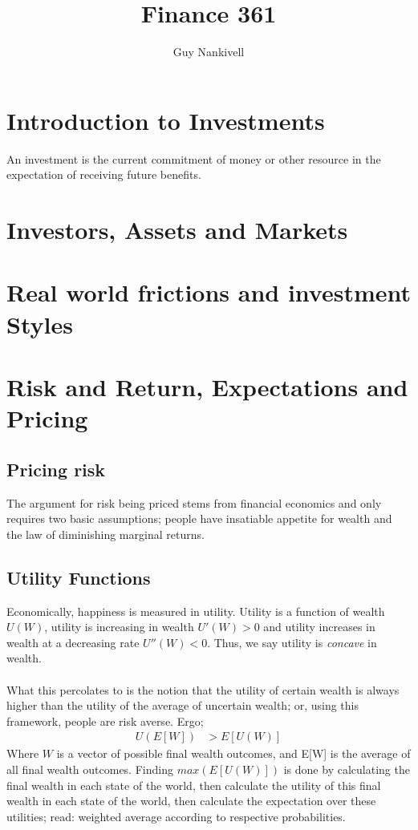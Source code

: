 \documentclass[a4paper]{article}
\title{Finance 361}
\date{}
\author{Guy Nankivell}
\begin{document}
\maketitle
\tableofcontents
\newpage

\section{Introduction to Investments}
An investment is the current commitment of money or other resource in the
expectation of receiving future benefits.
\section{Investors, Assets and Markets}

\section{Real world frictions and investment Styles}
\section{Risk and Return, Expectations and Pricing}
\subsection{Pricing risk}
The argument for risk being priced stems from financial economics and only
requires two basic assumptions; people have insatiable appetite 
for wealth and the law of diminishing marginal returns.
\subsection{Utility Functions}
Economically, happiness is measured in utility. Utility is a
function of wealth $U(W)$, utility is increasing in wealth $U'(W) > 0$
and utility increases in wealth at a decreasing rate $U''(W) < 0$. Thus,
we say utility is \emph{concave} in wealth.\\\\
%
%
What this percolates to is the notion that the utility of certain wealth
is always higher than the utility of the average of uncertain wealth;
or, using this framework, people are risk averse. Ergo;
\begin{align*}
U(E[W]) &> E[U(W)]
\end{align*}
Where $W$ is a vector of possible final wealth outcomes, and E[W]
is the average of all final wealth outcomes. Finding $max(E[U(W)])$
is done by calculating the final wealth in each state of the world,
then calculate the utility of this final wealth in each state of the world,
then calculate the expectation over these utilities; read: weighted average
according to respective probabilities.
\end{document}
